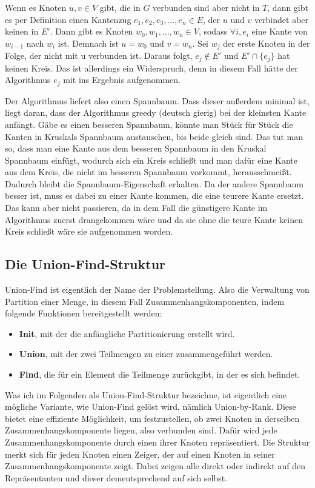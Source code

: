 Wenn es Knoten $u, v \in V$ gibt, die in $G$ verbunden sind aber nicht in $T$, dann gibt es per Definition einen Kantenzug $e_1, e_2, e_3, \dots, e_n \in E$, der $u$ und $v$ verbindet aber keinen in $E'$.
Dann gibt es Knoten $w_0, w_1, \dots, w_n \in V$, sodass $\forall i, e_i$ eine Kante von $w_{i-1}$ nach $w_i$ ist.
Demnach ist $u = w_0$ und $v = w_n$.
Sei $w_j$ der erste Knoten in der Folge, der nicht mit u verbunden ist.
Daraus folgt, $e_j \notin E'$ und $E'\cap\{e_j\}$ hat keinen Kreis.
Das ist allerdings ein Widerspruch, denn in diesem Fall hätte der Algorithmus $e_j$ mit ins Ergebnis aufgenommen.

Der Algorithmus liefert also einen Spannbaum.
Dass dieser außerdem minimal ist, liegt daran, dass der Algorithmus greedy (deutsch gierig) bei der kleinsten Kante anfängt.
Gäbe es einen besseren Spannbaum, könnte man Stück für Stück die Kanten in Kruskals Spannbaum austauschen, bis beide gleich sind.
Das tut man so, dass man eine Kante aus dem besseren Spannbaum in den Kruskal Spannbaum einfügt,
wodurch sich ein Kreis schließt und man dafür eine Kante aus dem Kreis, die nicht im besseren Spannbaum vorkommt, herausschmeißt.
Dadurch bleibt die Spannbaum-Eigenschaft erhalten.
Da der andere Spannbaum besser ist, muss es dabei zu einer Kante kommen, die eine teurere Kante ersetzt.
Das kann aber nicht passieren, da in dem Fall die günstigere Kante im Algorithmus zuerst drangekommen wäre und da sie ohne die teure Kante keinen Kreis schließt wäre sie aufgenommen worden.

\subsection{Die Union-Find-Struktur}
Union-Find ist eigentlich der Name der Problemstellung.
Also die Verwaltung von Partition einer Menge, in diesem Fall Zusammenhangskomponenten, indem folgende Funktionen bereitgestellt werden:
\begin{itemize}
  \item \textbf{Init}, mit der die anfängliche Partitionierung erstellt wird.
  \item \textbf{Union}, mit der zwei Teilmengen zu einer zusammengeführt werden.
  \item \textbf{Find}, die für ein Element die Teilmenge zurückgibt, in der es sich befindet.
\end{itemize}

Was ich im Folgenden als Union-Find-Struktur bezeichne, ist eigentlich eine mögliche Variante, wie Union-Find gelöst wird, nämlich Union-by-Rank.
Diese bietet eine effiziente Möglichkeit, um festzustellen, ob zwei Knoten in derselben Zusammenhangskomponente liegen, also verbunden sind.
Dafür wird jede Zusammenhangskomponente durch einen ihrer Knoten repräsentiert.
Die Struktur merkt sich für jeden Knoten einen Zeiger, der auf einen Knoten in seiner Zusammenhangskomponente zeigt.
Dabei zeigen alle direkt oder indirekt auf den Repräsentanten und dieser dementsprechend auf sich selbst.

